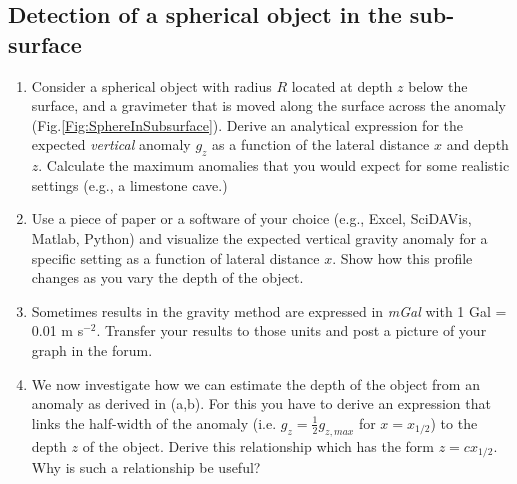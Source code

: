 \subsection{Detection of a spherical object in the sub-surface}
\label{Sec:SphereInSubsurface}
\begin{enumerate}[label=(\alph*)]
  \item Consider a spherical object with radius $R$ located at depth $z$ below the surface, and a gravimeter that is moved along the surface across the anomaly (Fig.\ref{Fig:SphereInSubsurface}). Derive an analytical expression for the expected \textit{vertical} anomaly $g_z$ as a function of the lateral distance $x$ and depth $z$. Calculate the maximum anomalies that you would expect for some realistic settings (e.g., a limestone cave.)

  \item Use a piece of paper or a software of your choice (e.g., Excel, SciDAVis, Matlab, Python) and visualize the expected vertical gravity anomaly for a specific setting as a function of lateral distance $x$. Show how this profile changes as you vary the depth of the object. 

  \item Sometimes results in the gravity method are expressed in \textit{mGal} with 1 Gal = 0.01 m s$^{-2}$. Transfer your results to those units and post a picture of your graph in the forum.

  \item We now investigate how we can estimate the depth of the object from an anomaly as derived in (a,b). For this you have to derive an expression that links the half-width of the anomaly (i.e. $g_z = \frac{1}{2}g_{z,max}$ for $x=x_{1/2}$) to the depth $z$ of the object. Derive this relationship which has the form $z = c x_{1/2}$. Why is such a relationship be useful?
\end{enumerate}

